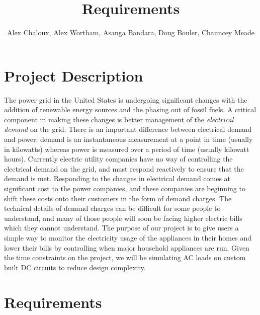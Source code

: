 \documentclass[12pt,letterpaper]{article}
\title{Requirements}
\author{Alex Chaloux, Alex Wortham, Asanga Bandara, Doug Bouler, Chauncey Meade}
\begin{document}
\reqstitlepage

\tableofcontents
\clearpage

\section{Project Description}

The power grid in the United States is undergoing significant changes with the
addition of renewable energy sources and the phasing out of fossil fuels.  A
critical component in making these changes is better management of the
\textit{electrical demand} on the grid.  There is an important difference
between electrical demand and power; demand is an instantaneous measurement at a
point in time (usually in kilowatts) whereas power is measured over a period of
time (usually kilowatt hours). Currently electric utility companies have no way
of controlling the electrical demand on the grid, and must respond reactively to
ensure that the demand is met.  Responding to the changes in electrical
demand comes at significant cost to the power companies, and these companies are
beginning to shift these costs onto their customers in the form of demand
charges.  The technical details of demand charges can be difficult for some
people to understand, and many of those people will soon be facing higher
electric bills which they cannot understand.
The purpose of our project is to give users a simple way to monitor the
electricity usage of the appliances in their homes and lower their bills by
controlling when major household appliances are run.  Given the time constraints
on the project, we will be simulating AC loads on custom built DC circuits to
reduce design complexity.


\clearpage
\section{Requirements}
\end{document}
